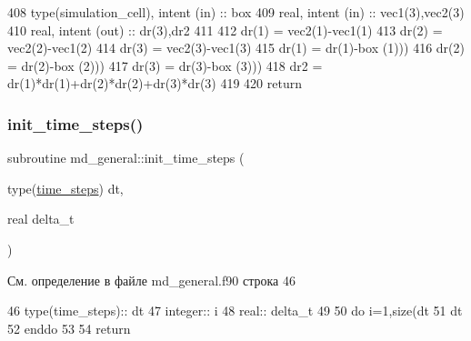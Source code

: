 \begin{DoxyCode}
408     \textcolor{keywordtype}{type}(simulation\_cell), \textcolor{keywordtype}{intent (in)} :: box
409     \textcolor{keywordtype}{real}, \textcolor{keywordtype}{intent (in)} :: vec1(3),vec2(3)
410     \textcolor{keywordtype}{real}, \textcolor{keywordtype}{intent (out)} :: dr(3),dr2
411 
412     dr(1) = vec2(1)-vec1(1)
413     dr(2) = vec2(2)-vec1(2)
414     dr(3) = vec2(3)-vec1(3)
415     dr(1) = dr(1)-box%
      (1)))
416     dr(2) = dr(2)-box%
      (2)))
417     dr(3) = dr(3)-box%
      (3)))
418     dr2 = dr(1)*dr(1)+dr(2)*dr(2)+dr(3)*dr(3)
419     
420     \textcolor{keywordflow}{return}
\end{DoxyCode}
\mbox{\label{namespacemd__general_a3a69c40fe5a6e7938d398f803b21e474}} 
\subsubsection{\texorpdfstring{init\+\_\+time\+\_\+steps()}{init\_time\_steps()}}
{\footnotesize\ttfamily subroutine md\+\_\+general\+::init\+\_\+time\+\_\+steps (\begin{DoxyParamCaption}\item[{type(\mbox{\hyperlink{structmd__general_1_1time__steps}{time\+\_\+steps}})}]{dt,  }\item[{real}]{delta\+\_\+t }\end{DoxyParamCaption})}



См. определение в файле md\+\_\+general.\+f90 строка 46


\begin{DoxyCode}
46     \textcolor{keywordtype}{type}(time\_steps):: dt
47     \textcolor{keywordtype}{integer}:: i
48     \textcolor{keywordtype}{real}::  delta\_t
49 
50     \textcolor{keywordflow}{do} i=1,\textcolor{keyword}{size}(dt%
51         dt%
52 \textcolor{keywordflow}{    enddo}
53 
54     \textcolor{keywordflow}{return}
\end{DoxyCode}
\mbox{\label{namespacemd__general_aca48dc12ea3fb99991acd82c2223a9bf}} 
